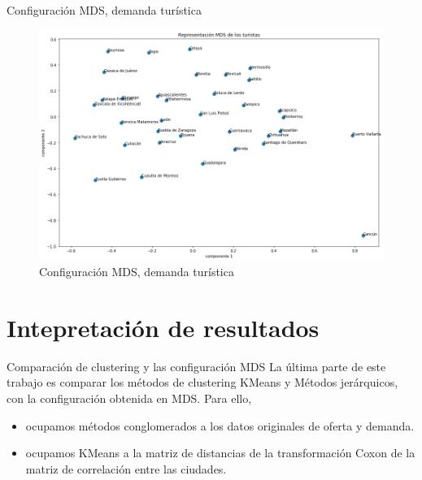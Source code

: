 \begin{frame}{Configuración MDS, demanda turística}
        \begin{figure}
        \centering
        \includegraphics[scale=.335]{figure/demanda_turistica_c.png}
        \caption{Configuración MDS, demanda turística}
        \label{fig:demanda_turistica_c}
    \end{figure}
\end{frame}

\section{Intepretación de resultados}
\begin{frame}{Comparación de clustering y las configuración MDS}
    La última parte de este trabajo es comparar los métodos de clustering KMeans y Métodos jerárquicos, con la configuración obtenida en MDS. Para ello, 
    \begin{itemize}
        \item ocupamos métodos conglomerados a los datos originales de oferta y demanda.
        
        \item ocupamos KMeans a la matriz de distancias de la transformación Coxon de la matriz de correlación entre las ciudades. 
    \end{itemize}
\end{frame}

